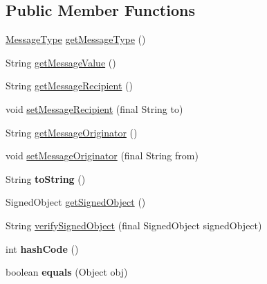 \subsection*{Public Member Functions}
\begin{DoxyCompactItemize}
\item 
\hyperlink{enumgov_1_1fnal_1_1ppd_1_1ZZattic_1_1MessageType}{Message\-Type} \hyperlink{classgov_1_1fnal_1_1ppd_1_1ZZattic_1_1MessageCarrier_a2815136c8454ff691761c23dac942d23}{get\-Message\-Type} ()
\item 
String \hyperlink{classgov_1_1fnal_1_1ppd_1_1ZZattic_1_1MessageCarrier_af81213bb578f70befcd2392ddf083628}{get\-Message\-Value} ()
\item 
String \hyperlink{classgov_1_1fnal_1_1ppd_1_1ZZattic_1_1MessageCarrier_a3b36f242dd877bcd0d7addff3328566a}{get\-Message\-Recipient} ()
\item 
void \hyperlink{classgov_1_1fnal_1_1ppd_1_1ZZattic_1_1MessageCarrier_a63f5a9d0dda64711b4abab44fc459e28}{set\-Message\-Recipient} (final String to)
\item 
String \hyperlink{classgov_1_1fnal_1_1ppd_1_1ZZattic_1_1MessageCarrier_a9041fb2440cfeb821c3143ddc641892e}{get\-Message\-Originator} ()
\item 
void \hyperlink{classgov_1_1fnal_1_1ppd_1_1ZZattic_1_1MessageCarrier_aabc6ee957150d1935f78294d443d3205}{set\-Message\-Originator} (final String from)
\item 
\hypertarget{classgov_1_1fnal_1_1ppd_1_1ZZattic_1_1MessageCarrier_af2efc53e04503aa52cf35c76733da79f}{String {\bfseries to\-String} ()}\label{classgov_1_1fnal_1_1ppd_1_1ZZattic_1_1MessageCarrier_af2efc53e04503aa52cf35c76733da79f}

\item 
Signed\-Object \hyperlink{classgov_1_1fnal_1_1ppd_1_1ZZattic_1_1MessageCarrier_a75bcc6f6e84614494d9121e858f2b48e}{get\-Signed\-Object} ()
\item 
String \hyperlink{classgov_1_1fnal_1_1ppd_1_1ZZattic_1_1MessageCarrier_afdb0e1272d9c3f27065bddc9d520087e}{verify\-Signed\-Object} (final Signed\-Object signed\-Object)
\item 
\hypertarget{classgov_1_1fnal_1_1ppd_1_1ZZattic_1_1MessageCarrier_a9184009b9338ac902a60a6bde4774bd1}{int {\bfseries hash\-Code} ()}\label{classgov_1_1fnal_1_1ppd_1_1ZZattic_1_1MessageCarrier_a9184009b9338ac902a60a6bde4774bd1}

\item 
\hypertarget{classgov_1_1fnal_1_1ppd_1_1ZZattic_1_1MessageCarrier_a7cd6ea7fb22a369f3a2af0090f70dfad}{boolean {\bfseries equals} (Object obj)}\label{classgov_1_1fnal_1_1ppd_1_1ZZattic_1_1MessageCarrier_a7cd6ea7fb22a369f3a2af0090f70dfad}

\end{DoxyCompactItemize}
